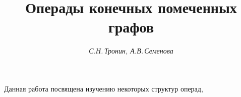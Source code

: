 \newcommand{\f}{\varphi}


\newcommand{\Fi}{\Phi}


\newcommand{\p}{\psi}


\newcommand{\Ps}{\Psi}


\newcommand{\A}{{\frak A}}


\newcommand{\G}{{\Gamma}}


\newcommand{\ar}[1]{\overset{#1}{\longrightarrow}{}}


\newcommand{\old}[1]{\ov{\ov{#1}}}


\newcommand{\ti}[1]{\widetilde{#1}}


\newcommand{\tts}[1]{}










\setcounter{page}{50}















\author{\it С.Н.\,Тронин, А.В.\,Семенова}




\title{Операды конечных помеченных графов}





\date{}




\pagestyle{plain} %







\maketitle


\label{begin}








Данная работа посвящена изучению некоторых структур операд,


